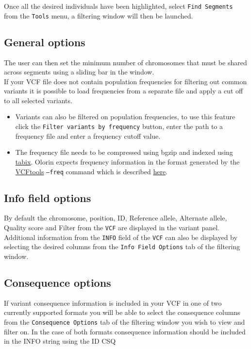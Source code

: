 \documentclass{article}
\begin{document}
			Once all the desired individuals have been highlighted, select \texttt{Find Segments} from the \texttt{Tools} menu, a filtering window will then be launched.

	\subsection{General options}
			The user can then set the minimum number of chromosomes that must be shared across segments using a sliding bar in the window.\\

			If your VCF file does not contain population frequencies for filtering out common variants it is possible to load frequencies from a separate file and apply a cut off to all selected variants.
			\begin{itemize}
				\item{Variants can also be filtered on population frequencies, to use this feature click the \texttt{Filter variants by frequency} button, enter the path to a frequency file and enter a frequency cutoff value.}
				\item{The frequency file needs to be compressed using bgzip and indexed using \href{http://samtools.sourceforge.net/tabix.shtml}{tabix}. Olorin expects frequency information in the format generated by the \href{http://vcftools.sourceforge.net/}{VCFtools} \texttt{--freq} command which is described \href{http://vcftools.sourceforge.net/options.html#stats}{here}.}
			\end{itemize}

\subsection{Info field options}
	By default the chromosome, position, ID, Reference allele, Alternate allele, Quality score and Filter from the \texttt{VCF} are displayed in the variant panel.\\

	 Additional information from the \texttt{INFO} field of the \texttt{VCF} can also be displayed by selecting the desired columns from the \texttt{Info Field Options} tab of the filtering window.

\subsection{Consequence options}
	If variant consequence information is included in your VCF in one of two currently supported formats you will be able to select the consequence columns from the  \texttt{Consequence Options} tab of the filtering window you wish to view and filter on. In the case of both formats consequence information should be included in the INFO string using the ID CSQ
	
\end{document}
